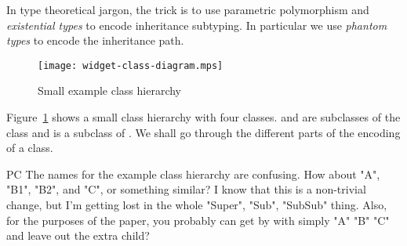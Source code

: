 \documentclass[workingdraft]{usetex-v1}
\begin{document}
In type theoretical jargon, the trick is to use parametric
polymorphism and \emph{existential types} to encode inheritance
subtyping.  In particular we use \emph{phantom types} to encode the
inheritance path.


\begin{figure}[htp]
  \centering
  \texttt{[image: widget-class-diagram.mps]}
  \caption{Small example class hierarchy}
  \label{fig:class-hierarchy}
\end{figure}

Figure~\ref{fig:class-hierarchy} shows a small class hierarchy with
four classes.  and 
are subclasses of the class  and
 is a subclass of .  We
shall go through the different parts of the encoding of a class.

\begin{ednote}{PC}
    The names for the example class hierarchy are confusing.
  How about "A", "B1", "B2", and "C", or something similar?
  I know that this is a non-trivial change, but I'm getting
  lost in the whole "Super", "Sub", "SubSub" thing.  Also, for
  the purposes of the paper, you probably can get by with
  simply "A" "B" "C" and leave out the extra child?
\end{ednote}
\end{document}
